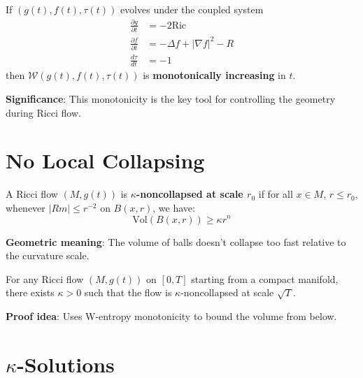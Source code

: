 \begin{theorem}
\label{thm:w_entropy_monotone}
If $(g(t), f(t), \tau(t))$ evolves under the coupled system
\begin{align*}
\frac{\partial g}{\partial t} &= -2 \text{Ric} \\
\frac{\partial f}{\partial t} &= -\Delta f + |\nabla f|^2 - R \\
\frac{d\tau}{dt} &= -1
\end{align*}
then $\mathcal{W}(g(t), f(t), \tau(t))$ is \textbf{monotonically increasing} in $t$.

\textbf{Significance}: This monotonicity is the key tool for controlling the geometry during Ricci flow.
\end{theorem}

\section{No Local Collapsing}

\begin{definition}
\label{def:kappa_noncollapsing}
A Ricci flow $(M, g(t))$ is \textbf{$\kappa$-noncollapsed at scale $r_0$} if for all $x \in M$, $r \leq r_0$, whenever $|Rm| \leq r^{-2}$ on $B(x, r)$, we have:
\[
\text{Vol}(B(x, r)) \geq \kappa r^n
\]

\textbf{Geometric meaning}: The volume of balls doesn't collapse too fast relative to the curvature scale.
\end{definition}

\begin{theorem}
\label{thm:perelman_no_local_collapsing}
For any Ricci flow $(M, g(t))$ on $[0, T]$ starting from a compact manifold, there exists $\kappa > 0$ such that the flow is $\kappa$-noncollapsed at scale $\sqrt{T}$.

\textbf{Proof idea}: Uses W-entropy monotonicity to bound the volume from below.
\end{theorem}

\section{$\kappa$-Solutions}

